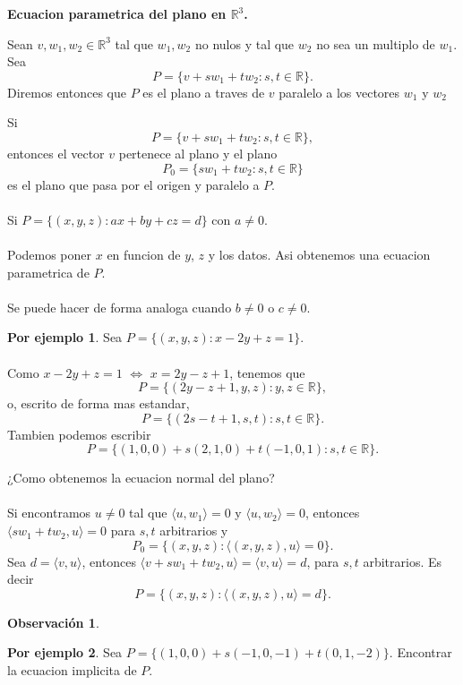 \documentclass{article}
\theoremstyle{definition}
\theoremstyle{definition}
\newtheorem*{obs}{Observación}
\newtheorem*{ej}{Por ejemplo}
\theoremstyle{remark}
\begin{document}
\begin{center}
  \textbf{Ecuacion parametrica del plano en $\mathbb{R}^3$.}
\end{center}
\begin{defi}
  Sean $v,w_1,w_2 \in \mathbb{R}^3$ tal que $w_1,w_2$ no nulos y tal que $w_2$ no sea un multiplo de $w_1$. Sea \[
    P=\{v+sw_1+tw_2 : s,t \in \mathbb{R}\}.
  \]
  Diremos entonces que $P$ es el plano a traves de $v$ paralelo a los vectores $w_1$ y $w_2$
  \end{defi}
  Si \[
    P=\{v+sw_1+tw_2 : s,t \in \mathbb{R}\},
  \]
  entonces el vector $v$ pertenece al plano y el plano \[
    P_0=\{sw_1+tw_2 : s,t \in \mathbb{R}\}
  \]
es el plano que pasa por el origen y paralelo a $P$.
\\\\
Si $P=\big\{(x,y,z) : ax+by+cz=d\big\}$ con $a \neq 0$.
\\\\
Podemos poner $x$ en funcion de $y$, $z$ y los datos. Asi obtenemos una ecuacion parametrica de $P$. \\\\
Se puede hacer de forma analoga cuando $b \neq 0$ o $c \neq 0$. 
\begin{ej}
  Sea $P=\big\{(x,y,z) : x-2y+z=1\big\}$.\\\\
  Como $x-2y+z=1$ $\Leftrightarrow$ $x=2y-z+1$, tenemos que\[
    P=\big\{(2y-z+1,y,z) : y,z \in \mathbb{R} \big\},
  \] 
  o, escrito de forma mas estandar, \[
    P=\big\{(2s-t+1,s,t) : s,t \in \mathbb{R}\big\}.
  \]
  Tambien podemos escribir \[
    P=\big\{(1,0,0)+s(2,1,0)+t(-1,0,1):s,t \in \mathbb{R}\big\}.
  \]
\end{ej}
¿Como obtenemos la ecuacion normal del plano?
\\\\
Si encontramos $u \neq 0$ tal que $\langle u,w_1 \rangle =0$ y $\langle u,w_2 \rangle=0$, entonces \mbox{$\langle sw_1+tw_2,u \rangle =0$} para $s,t$ arbitrarios y \[
  P_0=\big\{(x,y,z) : \big\langle(x,y,z),u\big\rangle=0\big\}.
\]
Sea $d=\langle v,u \rangle$, entonces $\langle v+sw_1+tw_2,u\rangle = \langle v,u \rangle = d $, para $s,t$ arbitrarios. Es decir \[
  P=\big\{(x,y,z) : \big\langle (x,y,z), u \big\rangle=d\big\}.
\]
\begin{obs}
  
\end{obs}
\begin{ej}
  Sea $P=\big\{(1,0,0)+s(-1,0,-1)+t(0,1,-2)\big\}.$ Encontrar la ecuacion implicita de $P$.
\end{ej}
\end{document}
